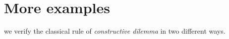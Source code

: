 \documentclass[12pt]{article}
\begin{document}
\section{More examples}
\begin{comment}
An example of a positive proof (using rules that do not involve negation).

\begin{description}

\item[Theorem:]  $((A \wedge B) \vee (B \wedge C)) \rightarrow B$

\begin{description}

\item[Assume(1):]  $(A \wedge B) \vee (B \wedge C)$

\item[Goal:]  $B$

We prove this by cases on (1).  This is basically the only thing we can do, if we are confined to the positive rules!

\item[Case 1:]

\begin{description}

\item

\item[Assume(1a):]  $A \wedge B$

\item[Goal:]  $B$

\item[(2a):]  $B$ simp line 1a


\end{description}


\item[Case 2:]  

\begin{description}

\item[Assume(1b):]  $B \wedge C$

\item[Goal:]  $B$

\item[(2b):]  $B$  simp line 1b
\end{description}

\item[(3):]  $B$ proof by cases 1,1a-2a,1b-2b

\end{description}

\item[(4):]  $((A \wedge B) \vee (B \wedge C)) \rightarrow B$ deduction 1-3

\end{description}

\end{comment} 
we verify the classical rule of {\em constructive dilemma\/} in two different ways.
\end{document}
